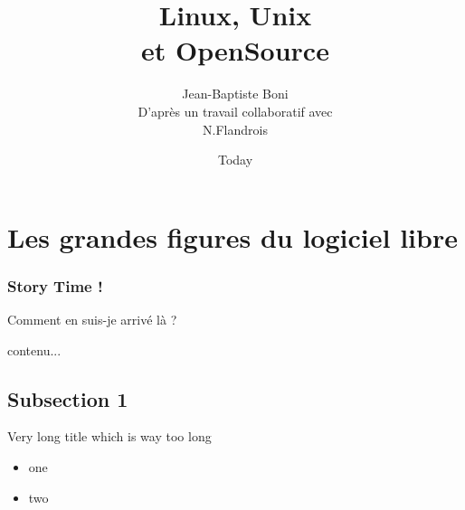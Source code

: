 \documentclass{beamer}
\title{Linux, Unix\\ et OpenSource}
\date{Today}
\author[JB Boni]{Jean-Baptiste Boni\\D'après un travail collaboratif avec\\ N.Flandrois}
\begin{document}
\begin{frame}[plain]
\titlepage
\end{frame}


\section{Les grandes figures du logiciel libre}

\begin{frame} 
\frametitle{Story Time !} 

Comment en suis-je arrivé là ?


\end{frame}

\begin{frame}
	contenu...
\end{frame}

\subsection{Subsection 1}
\begin{frame}{Very long title which is way too long}
\begin{itemize}
\item one
\item two
\end{itemize}
\end{frame}
\end{document}
